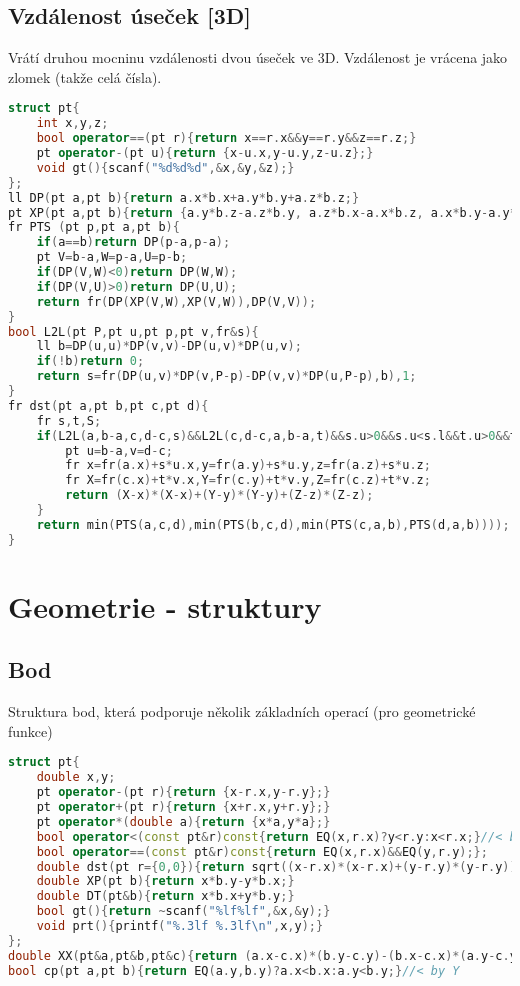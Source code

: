 \documentclass[11pt]{article}
\begin{document}
\subsection{Vzdálenost úseček [3D]}
Vrátí druhou mocninu vzdálenosti dvou úseček ve 3D. Vzdálenost je vrácena jako zlomek (takže celá čísla).
\begin{lstlisting}[language=C++]
struct pt{
    int x,y,z;
    bool operator==(pt r){return x==r.x&&y==r.y&&z==r.z;}
    pt operator-(pt u){return {x-u.x,y-u.y,z-u.z};}
    void gt(){scanf("%d%d%d",&x,&y,&z);}
};
ll DP(pt a,pt b){return a.x*b.x+a.y*b.y+a.z*b.z;}
pt XP(pt a,pt b){return {a.y*b.z-a.z*b.y, a.z*b.x-a.x*b.z, a.x*b.y-a.y*b.x};}
fr PTS (pt p,pt a,pt b){
    if(a==b)return DP(p-a,p-a);
    pt V=b-a,W=p-a,U=p-b;
    if(DP(V,W)<0)return DP(W,W);
    if(DP(V,U)>0)return DP(U,U);
    return fr(DP(XP(V,W),XP(V,W)),DP(V,V));
}
bool L2L(pt P,pt u,pt p,pt v,fr&s){
    ll b=DP(u,u)*DP(v,v)-DP(u,v)*DP(u,v);
    if(!b)return 0;
    return s=fr(DP(u,v)*DP(v,P-p)-DP(v,v)*DP(u,P-p),b),1;
}
fr dst(pt a,pt b,pt c,pt d){
    fr s,t,S;
    if(L2L(a,b-a,c,d-c,s)&&L2L(c,d-c,a,b-a,t)&&s.u>0&&s.u<s.l&&t.u>0&&t.u<t.l){
        pt u=b-a,v=d-c;
        fr x=fr(a.x)+s*u.x,y=fr(a.y)+s*u.y,z=fr(a.z)+s*u.z;
        fr X=fr(c.x)+t*v.x,Y=fr(c.y)+t*v.y,Z=fr(c.z)+t*v.z;
        return (X-x)*(X-x)+(Y-y)*(Y-y)+(Z-z)*(Z-z);
    }
    return min(PTS(a,c,d),min(PTS(b,c,d),min(PTS(c,a,b),PTS(d,a,b))));
}
\end{lstlisting}
\newpage\section{Geometrie - struktury}
\subsection{Bod}
Struktura bod, která podporuje několik základních operací (pro geometrické funkce)
\begin{lstlisting}[language=C++]
struct pt{
    double x,y;
    pt operator-(pt r){return {x-r.x,y-r.y};}
    pt operator+(pt r){return {x+r.x,y+r.y};}
    pt operator*(double a){return {x*a,y*a};}
    bool operator<(const pt&r)const{return EQ(x,r.x)?y<r.y:x<r.x;}//< by X
    bool operator==(const pt&r)const{return EQ(x,r.x)&&EQ(y,r.y);};
    double dst(pt r={0,0}){return sqrt((x-r.x)*(x-r.x)+(y-r.y)*(y-r.y));}
    double XP(pt b){return x*b.y-y*b.x;}
    double DT(pt&b){return x*b.x+y*b.y;}
    bool gt(){return ~scanf("%lf%lf",&x,&y);}
    void prt(){printf("%.3lf %.3lf\n",x,y);}
};
double XX(pt&a,pt&b,pt&c){return (a.x-c.x)*(b.y-c.y)-(b.x-c.x)*(a.y-c.y);}
bool cp(pt a,pt b){return EQ(a.y,b.y)?a.x<b.x:a.y<b.y;}//< by Y
\end{lstlisting}
\end{document}
